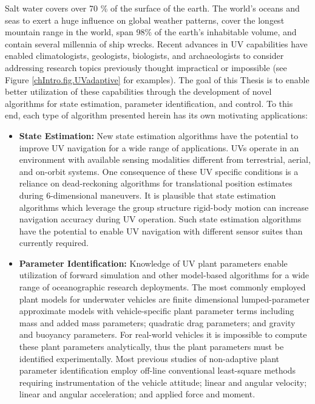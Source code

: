 Salt water covers over 70 \% of the surface of the earth.  
%
The world's oceans and seas to exert a huge influence on
global weather patterns, cover the longest mountain range in the
world, span 98\% of the earth's inhabitable volume, and contain
several millennia of ship wrecks.
%
Recent advances in \acf{UV} capabilities have enabled climatologists,
geologists, biologists, and archaeologists to consider addressing
research topics previously thought impractical or impossible (see
Figure \ref{chIntro.fig.UVadaptive} for examples).
%
The goal of this Thesis is to enable better utilization of these
capabilities through the development of novel algorithms for state
estimation, parameter identification, and control.
%
To this end, each type of algorithm presented herein has its own
motivating applications:
%
\begin{itemize}
%
\item {\bf State Estimation:}
%
New state estimation algorithms have the potential to improve \ac{UV}
navigation for a wide range of applications.
%
\acp{UV} operate in an environment with available sensing modalities
different from terrestrial, aerial, and on-orbit systems.
%
One consequence of these \ac{UV} specific conditions is a reliance on
dead-reckoning algorithms for translational position estimates
during 6-dimensional maneuvers.
%
It is plausible that state estimation algorithms which leverage the
group structure rigid-body motion can increase navigation
accuracy during \ac{UV} operation.
%
Such state estimation algorithms have the potential to enable \ac{UV}
navigation with different sensor suites than currently required.
%
\item {\bf Parameter Identification:} 
%
Knowledge of \ac{UV} plant parameters enable utilization of
forward simulation and other model-based algorithms for a wide range
of oceanographic research deployments.
%
The most commonly employed plant models for underwater vehicles are
finite dimensional lumped-parameter approximate models with
vehicle-specific plant parameter terms including mass and added mass
parameters; quadratic drag parameters; and gravity and buoyancy
parameters.  
%
For real-world vehicles it is impossible to compute these
plant parameters analytically, thus the plant parameters must be
identified experimentally.
%
Most previous studies of non-adaptive plant parameter identification
employ off-line conventional least-square methods requiring
instrumentation of the vehicle attitude; linear and angular velocity;
linear and angular acceleration; and applied force and moment.

\end{itemize}
